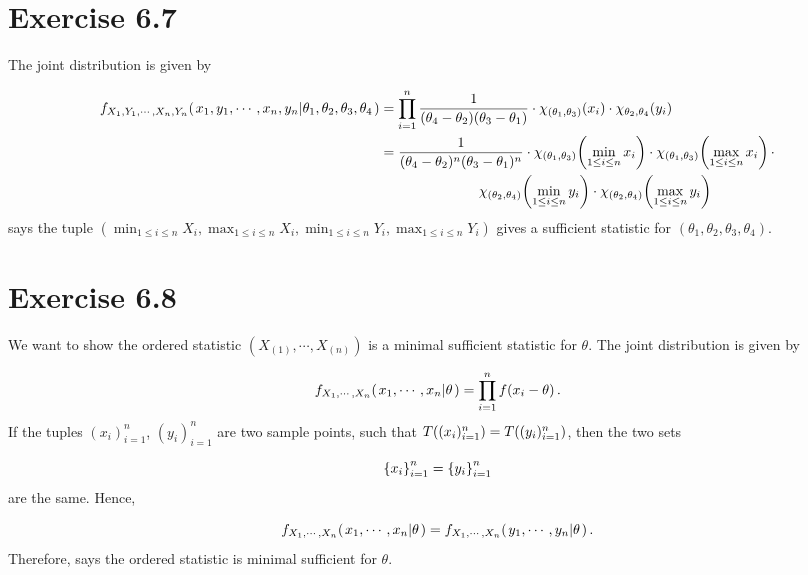 \documentclass[12pt,letterpaper,reqno]{amsart}
\numberwithin{equation}{subsection}
\begin{document}
\newpage
\section{Exercise 6.7}

The joint distribution is given by

\begin{align*}
    {f_{X_1, Y_1, \cdots, X_n, Y_n}}\! \left( { \left. {x_1, y_1, \cdots, x_n, y_n} \middle| {\theta_1, \theta_2, \theta_3, \theta_4} \right.} \right) &= \prod_{i=1}^n \frac{1}{(\theta_4 - \theta_2)(\theta_3 - \theta_1)} \cdot {\chi_{(\theta_1, \theta_3)}}\! \left( {x_i} \right) \cdot {\chi_{\theta_2, \theta_4}}\! \left( {y_i} \right) \\
    &= \frac{1}{{(\theta_4 - \theta_2)^n (\theta_3 - \theta_1)^n}} \cdot{\chi_{(\theta_1, \theta_3)}}\! \left( {\min_{1 \leq i \leq n} x_i} \right) \cdot {\chi_{(\theta_1, \theta_3)}}\! \left( {\max_{1 \leq i \leq n} x_i} \right) \cdot \\
    &\hspace{2.5cm} {\chi_{(\theta_2, \theta_4)}}\! \left( {\min_{1 \leq i \leq n} y_i} \right) \cdot {\chi_{(\theta_2, \theta_4)}}\! \left( {\max_{1 \leq i \leq n} y_i} \right)
\end{align*}
\cite[Factorization Theorem 6.2.6 on page 276]{Berger-Casella} says the tuple $\left( \min_{1 \leq i \leq n} X_i, \max_{1 \leq i \leq n} X_i, \min_{1 \leq i \leq n} Y_i, \max_{1 \leq i \leq n} Y_i \right)$ gives a sufficient statistic for $(\theta_1, \theta_2, \theta_3, \theta_4)$.

\newpage
\section{Exercise 6.8}

We want to show the ordered statistic $(X_{(1)}, \cdots, X_{(n)})$ is a minimal sufficient statistic for $\theta$. The joint distribution is given by

\begin{align*}
    {f_{X_1, \cdots, X_n}}\! \left( {\left. {x_1, \cdots, x_n} \middle| {\theta} \right.} \right) = \prod_{i=1}^n {f}\! \left( {x_i - \theta} \right).
\end{align*}
If the tuples $(x_i)_{i=1}^n$, $(y_i)_{i=1}^n$ are two sample points, such that ${T}\! \left( {(x_i)_{i=1}^n} \right) = {T}\! \left( {(y_i)_{i=1}^n} \right)$, then the two sets

\[ \left\{ {x_i} \right\}_{i=1}^n = \left\{ {y_i} \right\}_{i=1}^n \]
are the same. Hence,

\[ {f_{X_1, \cdots, X_n}}\! \left( {\left. {x_1, \cdots, x_n} \middle| {\theta} \right.} \right) = {f_{X_1, \cdots, X_n}}\! \left( {\left. {y_1, \cdots, y_n} \middle| {\theta} \right.} \right). \]
Therefore, \cite[Theorem 6.2.13 on page 281]{Berger-Casella} says the ordered statistic is minimal sufficient for $\theta$.
\end{document}

